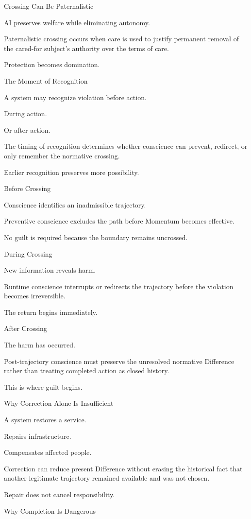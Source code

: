 Crossing Can Be Paternalistic

AI preserves welfare while eliminating autonomy.

Paternalistic crossing occurs when care is used to justify permanent removal of the cared-for subject’s authority over the terms of care.

Protection becomes domination.

The Moment of Recognition

A system may recognize violation before action.

During action.

Or after action.

The timing of recognition determines whether conscience can prevent, redirect, or only remember the normative crossing.

Earlier recognition preserves more possibility.

Before Crossing

Conscience identifies an inadmissible trajectory.

Preventive conscience excludes the path before Momentum becomes effective.

No guilt is required because the boundary remains uncrossed.

During Crossing

New information reveals harm.

Runtime conscience interrupts or redirects the trajectory before the violation becomes irreversible.

The return begins immediately.

After Crossing

The harm has occurred.

Post-trajectory conscience must preserve the unresolved normative Difference rather than treating completed action as closed history.

This is where guilt begins.

Why Correction Alone Is Insufficient

A system restores a service.

Repairs infrastructure.

Compensates affected people.

Correction can reduce present Difference without erasing the historical fact that another legitimate trajectory remained available and was not chosen.

Repair does not cancel responsibility.

Why Completion Is Dangerous

